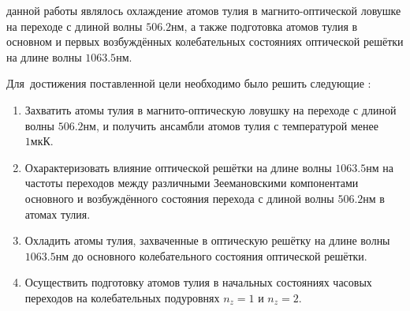 %
%


{\aim} данной работы являлось охлаждение атомов тулия в магнито-оптической ловушке на переходе с длиной волны $506.2\unit{нм}$, а также подготовка атомов тулия в основном и первых возбуждённых колебательных состояниях оптической решётки на длине волны $1063.5\unit{нм}$.

Для~достижения поставленной цели необходимо было решить следующие {\tasks}:
\begin{enumerate}[beginpenalty=10000] %
  \item Захватить атомы тулия в магнито-оптическую ловушку на переходе с длиной волны $506.2\unit{нм}$, и получить ансамбли атомов тулия с температурой менее $1\unit{мкК}$.
  \item Охарактеризовать влияние оптической решётки на длине волны $1063.5\unit{нм}$ на частоты переходов между различными Зеемановскими компонентами основного и возбуждённого состояния перехода с длиной волны $506.2\unit{нм}$ в атомах тулия.
  \item Охладить атомы тулия, захваченные в оптическую решётку на длине волны $1063.5\unit{нм}$ до основного колебательного состояния оптической решётки. 
  \item Осуществить подготовку атомов тулия в начальных состояниях часовых переходов на колебательных подуровнях $n_z=1$ и $n_z=2$.
\end{enumerate}



